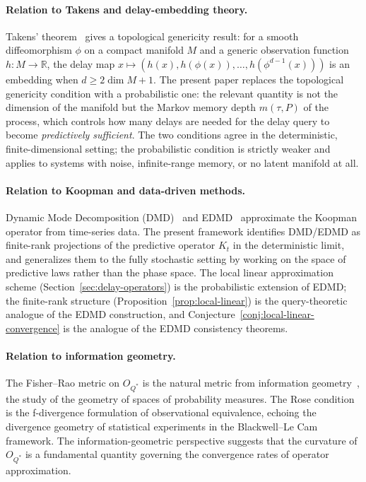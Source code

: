 \paragraph{Relation to Takens and delay-embedding theory.}
Takens' theorem~\cite{Takens1981} gives a topological genericity result:
for a smooth diffeomorphism $\phi$ on a compact manifold $M$ and a generic
observation function $h:M\to\mathbb{R}$, the delay map $x\mapsto
(h(x),h(\phi(x)),\ldots,h(\phi^{d-1}(x)))$ is an embedding when $d\geq
2\dim M+1$.  The present paper replaces the topological genericity condition
with a probabilistic one: the relevant quantity is not the dimension of the
manifold but the Markov memory depth $m(\tau,P)$ of the process, which
controls how many delays are needed for the delay query to become
\emph{predictively sufficient}.  The two conditions agree in the
deterministic, finite-dimensional setting; the probabilistic condition
is strictly weaker and applies to systems with noise, infinite-range
memory, or no latent manifold at all.

\paragraph{Relation to Koopman and data-driven methods.}
Dynamic Mode Decomposition (DMD)~\cite{Schmid2010} and
EDMD~\cite{Williams2015} approximate the Koopman operator from
time-series data.  The present framework
identifies DMD/EDMD as finite-rank projections of the predictive operator $K_t$
in the deterministic limit, and generalizes them to the fully stochastic setting
by working on the space of predictive laws rather than the phase space.  The
local linear approximation scheme (Section~\ref{sec:delay-operators}) is the
probabilistic extension of EDMD; the finite-rank structure
(Proposition~\ref{prop:local-linear}) is the query-theoretic analogue of the
EDMD construction, and Conjecture~\ref{conj:local-linear-convergence} is the
analogue of the EDMD consistency theorems.

\paragraph{Relation to information geometry.}
The Fisher--Rao metric on $O_{Q^*}$ is the natural metric from information
geometry~\cite{Amari2016}, the study of the geometry of spaces of probability
measures.  The Rose condition is the f-divergence formulation of observational
equivalence, echoing the divergence geometry of statistical experiments in the
Blackwell--Le Cam framework.  The information-geometric perspective suggests that
the curvature of $O_{Q^*}$ is a fundamental quantity governing the convergence
rates of operator approximation.

